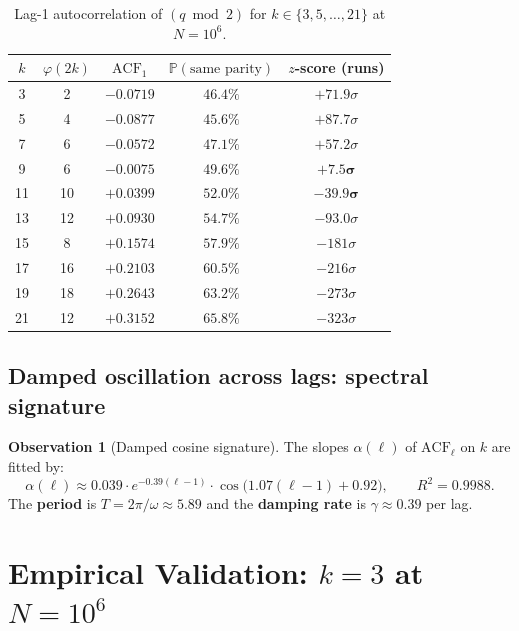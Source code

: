 \documentclass[11pt,a4paper]{article}
\theoremstyle{plain}
\theoremstyle{definition}
\newtheorem{observation}[theorem]{Observation}
\begin{document}
\begin{table}[h!]
\centering
\caption{Lag-1 autocorrelation of $(q \bmod 2)$ for $k \in \{3, 5, \ldots, 21\}$
at $N = 10^6$.}
\begin{tabular}{c c c c c}
\toprule
$k$ & $\varphi(2k)$ & $\mathrm{ACF}_1$ & $\mathbb{P}(\text{same parity})$ & $z$-score (runs) \\
\midrule
3 & 2 & $-0.0719$ & $46.4\%$ & $+71.9\sigma$ \\
5 & 4 & $-0.0877$ & $45.6\%$ & $+87.7\sigma$ \\
7 & 6 & $-0.0572$ & $47.1\%$ & $+57.2\sigma$ \\
9 & 6 & $\mathbf{-0.0075}$ & $\mathbf{49.6\%}$ & $\mathbf{+7.5\sigma}$ \\
11 & 10 & $\mathbf{+0.0399}$ & $\mathbf{52.0\%}$ & $\mathbf{-39.9\sigma}$ \\
13 & 12 & $+0.0930$ & $54.7\%$ & $-93.0\sigma$ \\
15 & 8 & $+0.1574$ & $57.9\%$ & $-181\sigma$ \\
17 & 16 & $+0.2103$ & $60.5\%$ & $-216\sigma$ \\
19 & 18 & $+0.2643$ & $63.2\%$ & $-273\sigma$ \\
21 & 12 & $+0.3152$ & $65.8\%$ & $-323\sigma$ \\
\bottomrule
\end{tabular}
\end{table}

\subsection{Damped oscillation across lags: spectral signature}

\begin{discoverybox}
\begin{observation}[Damped cosine signature]\label{disc:cosine}
The slopes $\alpha(\ell)$ of $\mathrm{ACF}_\ell$ on $k$ are fitted by:
\[
\alpha(\ell) \approx 0.039 \cdot e^{-0.39(\ell-1)} \cdot \cos\!\bigl(1.07(\ell-1) + 0.92\bigr),
\qquad R^2 = 0.9988.
\]
The \textbf{period} is $T = 2\pi/\omega \approx 5.89$ and the
\textbf{damping rate} is $\gamma \approx 0.39$ per lag.
\end{observation}
\end{discoverybox}

\section{Empirical Validation: $k = 3$ at $N = 10^6$}
\label{sec:validation-k3}
\end{document}
